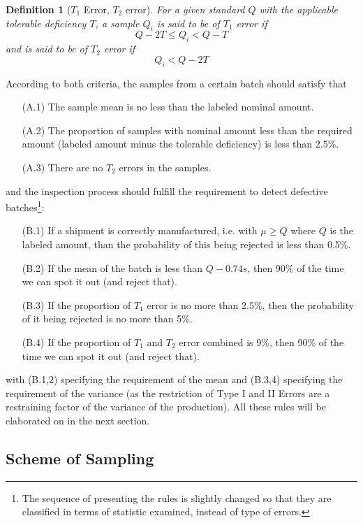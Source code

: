 \documentclass[12pt]{article}
\newtheorem{definition}{Definition}[section]
\begin{document}
\begin{definition}[$T_1$ Error, $T_2$ error]
    For a given standard $Q$ with the applicable tolerable deficiency $T$, a sample $Q_i$ is said to be of $T_1$ error if
    $$
    Q-2T \leq Q_i < Q-T
    $$
    and is said to be of $T_2$ error if
    $$
    Q_i < Q-2T
    $$
\end{definition}

According to both criteria, the samples from a certain batch should satisfy that
\begin{enumerate}
    \item[(A.1)] The sample mean is no less than the labeled nominal amount.
    \item[(A.2)] The proportion of samples with nominal amount less than the required amount (labeled amount minus the tolerable deficiency) is less than 2.5\%.
    \item[(A.3)] There are no $T_2$ errors in the samples. 
\end{enumerate}
and the inspection process should fulfill the requirement to detect defective batches\footnote{The sequence of presenting the rules is slightly changed so that they are classified in terms of statistic examined, instead of type of errors.}:
\begin{enumerate}
    \item[(B.1)] If a shipment is correctly manufactured, i.e. with $\mu\geq Q$ where $Q$ is the labeled amount, than the probability of this being rejected is less than 0.5\%.
    \item[(B.2)] If the mean of the batch is less than $Q-0.74s$, then 90\% of the time we can spot it out (and reject that).
    \item[(B.3)] If the proportion of $T_1$ error is no more than 2.5\%, then the probability of it being rejected is no more than 5\%.
    \item[(B.4)] If the proportion of $T_1$ and $T_2$ error combined is 9\%, then 90\% of the time we can spot it out (and reject that).
\end{enumerate}
with (B.1,2) specifying the requirement of the mean and (B.3,4) specifying the requirement of the variance (as the restriction of Type I and II Errors are a restraining factor of the variance of the production). All these rules will be elaborated on in the next section.

\subsection{Scheme of Sampling}
\end{document}
